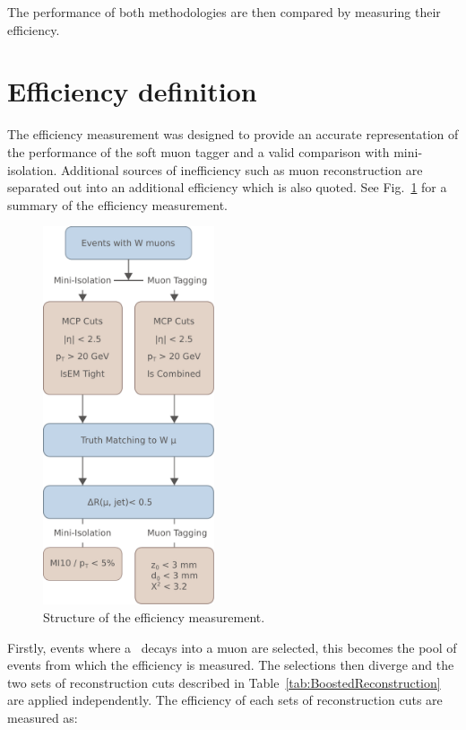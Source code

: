 The performance of both methodologies are then compared by measuring their efficiency.

\section{Efficiency definition} \label{sec:BoostedEfficiencyDefinition}

The efficiency measurement was designed to provide an accurate representation of the performance of the soft muon tagger and a valid comparison with mini-isolation. Additional sources of inefficiency such as muon reconstruction are separated out into an additional efficiency which is also quoted. See Fig.~\ref{fig:BoostedFlowChart} for a summary of the efficiency measurement.

\begin{figure}[t][th!]
  \centering
  \includegraphics[width=0.45\textwidth]{PartBoosted/Plots/FlowChart.pdf}
  \caption{Structure of the efficiency measurement.} \label{fig:BoostedFlowChart}
\end{figure}

Firstly, events where a \W\ decays into a muon are selected, this becomes the pool of events from which the efficiency is measured. The selections then diverge and the two sets of reconstruction cuts described in Table~\ref{tab:BoostedReconstruction} are applied independently. The efficiency of each sets of reconstruction cuts are measured as:


